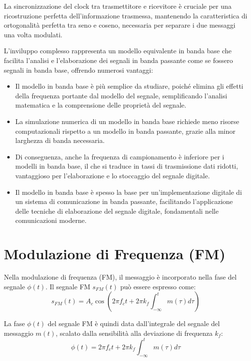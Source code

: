 La sincronizzazione del clock tra trasmettitore e ricevitore è cruciale per una ricostruzione perfetta dell'informazione trasmessa, mantenendo la caratteristica di ortogonalità perfetta tra seno e coseno, necessaria per separare i due messaggi una volta modulati.

L'inviluppo complesso rappresenta un modello equivalente in banda base che facilita l'analisi e l'elaborazione dei segnali in banda passante come se fossero segnali in banda base, offrendo numerosi vantaggi:
\begin{itemize}
    \item Il modello in banda base è più semplice da studiare, poiché elimina gli effetti della frequenza portante dal modello del segnale, semplificando l'analisi matematica e la comprensione delle proprietà del segnale.
    \item La simulazione numerica di un modello in banda base richiede meno risorse computazionali rispetto a un modello in banda passante, grazie alla minor larghezza di banda necessaria.
    \item Di conseguenza, anche la frequenza di campionamento è inferiore per i modelli in banda base, il che si traduce in tassi di trasmissione dati ridotti, vantaggioso per l'elaborazione e lo stoccaggio del segnale digitale.
    \item Il modello in banda base è spesso la base per un'implementazione digitale di un sistema di comunicazione in banda passante, facilitando l'applicazione delle tecniche di elaborazione del segnale digitale, fondamentali nelle comunicazioni moderne.
\end{itemize}

\section*{Modulazione di Frequenza (FM)}

Nella modulazione di frequenza (FM), il messaggio è incorporato nella fase del segnale \( \phi(t) \). Il segnale FM \( s_{FM}(t) \) può essere espresso come:
\begin{equation}
    s_{FM}(t) = A_c \cos\left(2\pi f_c t + 2\pi k_f \int_{-\infty}^{t} m(\tau) d\tau \right)
\end{equation}

La fase \( \phi(t) \) del segnale FM è quindi data dall'integrale del segnale del messaggio \( m(t) \), scalato dalla sensibilità alla deviazione di frequenza \( k_f \):
\begin{equation}
    \phi(t) = 2\pi f_c t + 2\pi k_f \int_{-\infty}^{t} m(\tau) d\tau
\end{equation}

